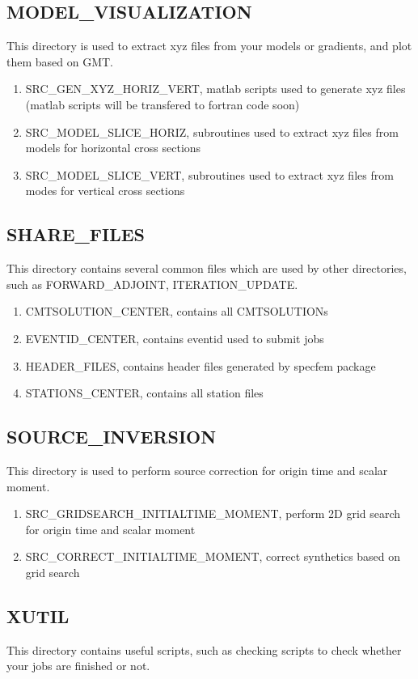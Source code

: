 \documentclass[11pt]{article}
\begin{document}
\subsection{MODEL\_VISUALIZATION}
This directory is used to extract xyz files from your models or gradients, and plot them based on GMT.
\begin{enumerate}
\item SRC\_GEN\_XYZ\_HORIZ\_VERT, matlab scripts used to generate xyz files (matlab scripts will be transfered to fortran code soon)
\item SRC\_MODEL\_SLICE\_HORIZ, subroutines used to extract xyz files from models for horizontal cross sections
\item SRC\_MODEL\_SLICE\_VERT, subroutines used to extract xyz files from modes for vertical cross sections
\end{enumerate}


\subsection{SHARE\_FILES}
This directory contains several common files which are used by other directories, such as FORWARD\_ADJOINT, ITERATION\_UPDATE.
\begin{enumerate}
\item CMTSOLUTION\_CENTER, contains all CMTSOLUTIONs
\item EVENTID\_CENTER, contains eventid used to submit jobs
\item HEADER\_FILES, contains header files generated by specfem package
\item STATIONS\_CENTER, contains all station files
\end{enumerate}


\subsection{SOURCE\_INVERSION}
This directory is used to perform source correction for origin time and scalar moment.
\begin{enumerate}
\item SRC\_GRIDSEARCH\_INITIALTIME\_MOMENT, perform 2D grid search for origin time and scalar moment
\item SRC\_CORRECT\_INITIALTIME\_MOMENT, correct synthetics based on grid search
\end{enumerate}

\subsection{XUTIL}
This directory contains useful scripts, such as checking scripts to check whether your jobs are finished or not.
\end{document}
